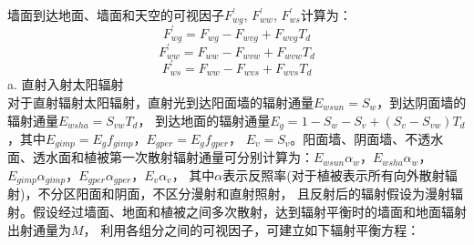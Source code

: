 墙面到达地面、墙面和天空的可视因子$F_{wg}^\prime$, $F_{ww}^\prime$, $F_{ws}^\prime$计算为：
\begin{equation}
F_{w g}^{\prime}=F_{w g}-F_{wvg}+F_{wvg} T_{d}
\end{equation}
\begin{equation}
F_{ww}^{\prime}=F_{ww}-F_{wvw}+F_{wvw} T_{d}
\end{equation}
\begin{equation}
F_{ws}^{\prime}=F_{ww}-F_{wvs}+F_{wvs} T_{d}
\end{equation}
a. 直射入射太阳辐射\\
对于直射辐射太阳辐射，直射光到达阳面墙的辐射通量$E_{wsun}=S_w$，到达阴面墙的辐射通量$E_{wsha}=S_{vw}T_d$，
到达地面的辐射通量$E_g=1-S_w-S_v+\left(S_v-S_{vw}\right)T_d$，其中$E_{gimp}=E_gf_{gimp}$，$E_{gper}=E_gf_{gper}$，
$E_v=S_v$。阳面墙、阴面墙、不透水面、透水面和植被第一次散射辐射通量可分别计算为：$E_{wsun}\alpha_w$，$E_{wsha}\alpha_w$，
$E_{gimp}\alpha_{gimp}$，$E_{gper}\alpha_{gper}$，$E_v\alpha_v$，
其中$\alpha$表示反照率(对于植被表示所有向外散射辐射)，不分区阳面和阴面，不区分漫射和直射照射，
且反射后的辐射假设为漫射辐射。假设经过墙面、地面和植被之间多次散射，达到辐射平衡时的墙面和地面辐射出射通量为$M$，
利用各组分之间的可视因子，可建立如下辐射平衡方程：
